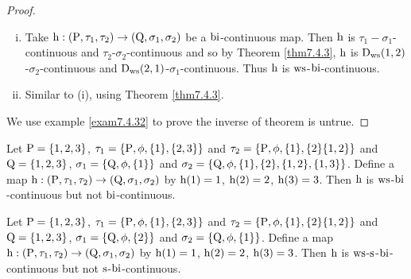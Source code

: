 \begin{proof}
\begin{enumerate}[(i)]
\item Take $\mathrm{h}:(\mathrm{P}, \tau_1, \tau_2 )\to (\mathrm{Q}, \sigma_{1}, \sigma_{2} )$ be a $\mathrm{bi}$-continuous map. Then $\mathrm{h}$ is $\tau_1 -\sigma_{1}$-continuous and $\tau_2$-$\sigma_{2}$-continuous and so by Theorem \ref{thm7.4.3}, $\mathrm{h}$ is $\mathrm{D}_{\mathrm{ws}} (1, 2)$-$\sigma_{2}$-continuous and $\mathrm{D}_{\mathrm{ws}} (2, 1)$-$\sigma_{1}$-continuous. Thus $\mathrm{h}$ is $\mathrm{ws}$-$\mathrm{bi}$-continuous.

\item Similar to (i), using Theorem \ref{thm7.4.3}.
\end{enumerate}

We use example \ref{exam7.4.32} to prove the inverse of theorem is untrue.
\end{proof}

\begin{exm}\label{exam7.4.32}
Let $\mathrm{P}=\{1,2,3\}$, $\tau_1 =\{\mathrm{P}, \phi, \{1\},\{2,3\}\}$ and $\tau_2 =\{\TSP, \phi,\{1\},\{2\}\break \{1,2\}\}$ and $\mathrm{Q}=\{1,2,3\}$, $\sigma_{1} =\{\mathrm{Q}, \phi, \{1\}\}$ and $\sigma_{2} =\{\mathrm{Q}, \phi, \{1\},\{2\},\{1,2\},\{1,3\}\}$. Define a map $\mathrm{h}: (\mathrm{P}, \tau_1, \tau_2 )\to (\mathrm{Q}, \sigma_{1}, \sigma_{2} )$ by $\mathrm{h}(1)=1$, $\mathrm{h}(2)=2$, $\mathrm{h}(3)=3$. Then $\mathrm{h}$ is $\mathrm{ws}$-$\mathrm{bi}$-continuous but not $\mathrm{bi}$-continuous.
\end{exm}

\begin{exm}\label{exam7.4.33}
Let $\mathrm{P}=\{1,2,3\}$, $\tau_1 =\{\mathrm{P}, \phi, \{1\},\{2,3\}\}$ and $\tau_2 =\{\TSP, \phi,\{1\},\{2\}\break \{1,2\}\}$ and $\mathrm{Q}=\{1,2,3\}$, $\sigma_{1} =\{\mathrm{Q}, \phi, \{2\}\}$ and $\sigma_{2} =\{\mathrm{Q}, \phi, \{1\}\}$. Define a map $\mathrm{h}: (\mathrm{P}, \tau_1, \tau_2)\to (\mathrm{Q}, \sigma_{1}, \sigma_{2} )$ by $\mathrm{h}(1)=1$, $\mathrm{h}(2)=2$, $\mathrm{h}(3)=3$. Then $\mathrm{h}$ is $\mathrm{ws}$-$\mathrm{s}$-$\mathrm{bi}$-continuous but not $\mathrm{s}$-$\mathrm{bi}$-continuous.
\end{exm}
